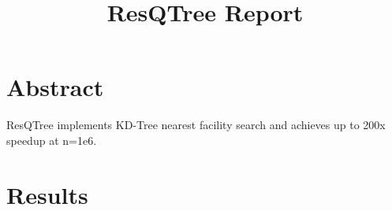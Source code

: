 \documentclass{article}
\begin{document}
\title{ResQTree Report}
\maketitle
\section{Abstract}
ResQTree implements KD-Tree nearest facility search and achieves up to 200x speedup at n=1e6.
\section{Results}

\end{document}
